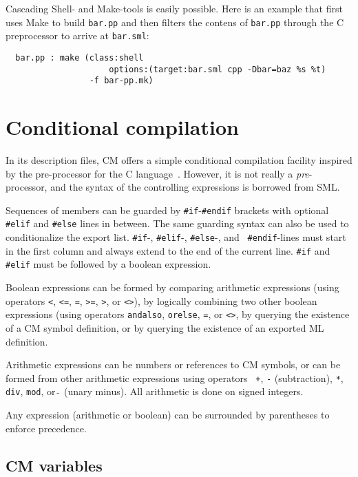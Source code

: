 \documentclass{article}
\begin{document}
Cascading Shell- and Make-tools is easily possible.  Here is an
example that first uses Make to build {\tt bar.pp} and then filters
the contens of {\tt bar.pp} through the C preprocessor to arrive at
{\tt bar.sml}:

\begin{verbatim}
  bar.pp : make (class:shell
                     options:(target:bar.sml cpp -Dbar=baz %s %t)
                 -f bar-pp.mk)
\end{verbatim}

\section{Conditional compilation}
\label{sec:preproc}

In its description files, CM offers a simple conditional compilation
facility inspired by the pre-processor for the C language~\cite{k&r2}.
However, it is not really a {\it pre}-processor, and the syntax of the
controlling expressions is borrowed from SML.

Sequences of members can be guarded by {\tt \#if}-{\tt \#endif}
brackets with optional {\tt \#elif} and {\tt \#else} lines in between.
The same guarding syntax can also be used to conditionalize the export
list.  {\tt \#if}-, {\tt \#elif}-, {\tt \#else}-, and {\tt
\#endif}-lines must start in the first column and always
extend to the end of the current line.  {\tt \#if} and {\tt \#elif}
must be followed by a boolean expression.

Boolean expressions can be formed by comparing arithmetic expressions
(using operators {\tt <}, {\tt <=}, {\tt =}, {\tt >=}, {\tt >}, or
{\tt <>}), by logically combining two other boolean expressions (using
operators {\tt andalso}, {\tt orelse}, {\tt =}, or {\tt <>}, by
querying the existence of a CM symbol definition, or by querying the
existence of an exported ML definition.

Arithmetic expressions can be numbers or references to CM symbols, or
can be formed from other arithmetic expressions using operators {\tt
+}, {\tt -} (subtraction), \verb|*|, {\tt div}, {\tt mod}, or $\tilde{~}$
(unary minus).  All arithmetic is done on signed integers.

Any expression (arithmetic or boolean) can be surrounded by
parentheses to enforce precedence.

\subsection{CM variables}
\label{sec:cmvars}
\end{document}
